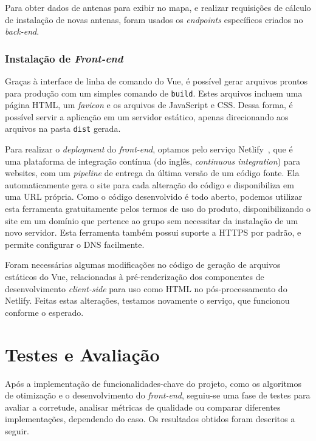 \documentclass[]{politex}
\begin{document}
Para obter dados de antenas para exibir no mapa, e realizar requisições de
cálculo de instalação de novas antenas, foram usados os \textit{endpoints}
específicos criados no \textit{back-end}.

\subsection{Instalação de \textit{Front-end}}

Graças à interface de linha de comando do Vue, é possível gerar arquivos
prontos para produção com um simples comando de \texttt{build}. Estes arquivos
incluem uma página HTML, um \textit{favicon} e os arquivos de JavaScript e CSS.
Dessa forma, é possível servir a aplicação em um servidor estático, apenas
direcionando aos arquivos na pasta \texttt{dist} gerada.

Para realizar o \textit{deployment} do \textit{front-end}, optamos pelo serviço
Netlify~\cite{netlify}, que é uma plataforma de integração contínua (do inglês,
\textit{continuous integration}) para websites, com um \textit{pipeline} de
entrega da última versão de um código fonte. Ela automaticamente gera o site
para cada alteração do código e disponibiliza em uma URL própria. Como o código
desenvolvido é todo aberto, podemos utilizar esta ferramenta gratuitamente pelos
termos de uso do produto, disponibilizando o site em um domínio que pertence ao
grupo sem necessitar da instalação de um novo servidor. Esta ferramenta também
possui suporte a HTTPS por padrão, e permite configurar o DNS facilmente.

Foram necessárias algumas modificações no código de geração de arquivos
estáticos do Vue, relacionadas à pré-renderização dos componentes de
desenvolvimento \textit{client-side} para uso como HTML no pós-processamento
do Netlify. Feitas estas alterações, testamos novamente o serviço, que funcionou
conforme o esperado.

\chapter{Testes e Avaliação}

Após a implementação de funcionalidades-chave do projeto, como os algoritmos de
otimização e o desenvolvimento do \textit{front-end}, seguiu-se uma fase de
testes para avaliar a corretude, analisar métricas de qualidade ou comparar
diferentes implementações, dependendo do caso. Os resultados obtidos foram
descritos a seguir.
\end{document}
